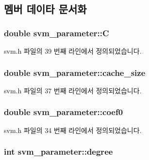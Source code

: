 \subsection{멤버 데이타 문서화}
\hypertarget{structsvm__parameter_af4f905a3f7d589d86964289af3c9d812}{
\subsubsection[{C}]{\setlength{\rightskip}{0pt plus 5cm}double svm\+\_\+parameter\+::\+C}}\label{structsvm__parameter_af4f905a3f7d589d86964289af3c9d812}


svm.\+h 파일의 39 번째 라인에서 정의되었습니다.

\hypertarget{structsvm__parameter_a00286b7e0767e45d68ac7abceb60c821}{
\subsubsection[{cache\+\_\+size}]{\setlength{\rightskip}{0pt plus 5cm}double svm\+\_\+parameter\+::cache\+\_\+size}}\label{structsvm__parameter_a00286b7e0767e45d68ac7abceb60c821}


svm.\+h 파일의 37 번째 라인에서 정의되었습니다.

\hypertarget{structsvm__parameter_a3ab3555a96a578bea6e5285a5db0a4db}{
\subsubsection[{coef0}]{\setlength{\rightskip}{0pt plus 5cm}double svm\+\_\+parameter\+::coef0}}\label{structsvm__parameter_a3ab3555a96a578bea6e5285a5db0a4db}


svm.\+h 파일의 34 번째 라인에서 정의되었습니다.

\hypertarget{structsvm__parameter_afef1c4508ec0045c236a3308b0fa5138}{
\subsubsection[{degree}]{\setlength{\rightskip}{0pt plus 5cm}int svm\+\_\+parameter\+::degree}}\label{structsvm__parameter_afef1c4508ec0045c236a3308b0fa5138}


